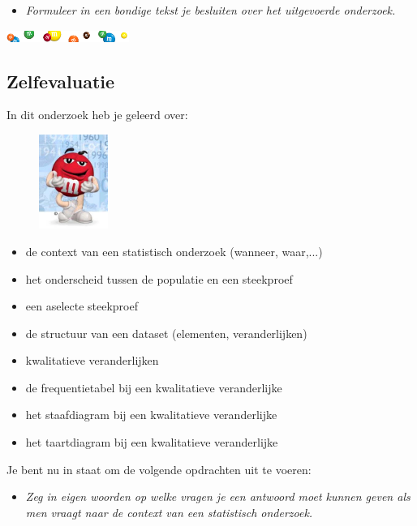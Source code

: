 \documentclass[11pt]{article}
\newcommand{\vraag}[2]{\begin{itemize}\item {\it #1} \vspace*{#2}\end{itemize}}
\begin{document}
\vraag{Formuleer in een bondige tekst je besluiten over het uitgevoerde onderzoek.}{7cm}

\begin{center}
  \includegraphics[width=0.3\textwidth]{MenM-snoepjes_banner}
\end{center}

\subsection{Zelfevaluatie}
In dit onderzoek heb je geleerd over:\\
\begin{figure}
  \vspace{1cm}
  \includegraphics[width=0.2\textwidth]{MenM-zelfeval}
\end{figure}
\vspace{-1cm}
\begin{itemize}
  \item de context van een statistisch onderzoek (wanneer, waar,...)
  \item het onderscheid tussen de populatie en een steekproef
  \item een aselecte steekproef
  \item de structuur van een dataset (elementen, veranderlijken)
  \item kwalitatieve veranderlijken
  \item de frequentietabel bij een kwalitatieve veranderlijke
  \item het staafdiagram bij een kwalitatieve veranderlijke
  \item het taartdiagram bij een kwalitatieve veranderlijke
\end{itemize}

Je bent nu in staat om de volgende opdrachten uit te voeren:

\vraag{Zeg in eigen woorden op welke vragen je een antwoord moet kunnen geven als men vraagt
naar de context van een statistisch onderzoek.}{3cm}
\end{document}
